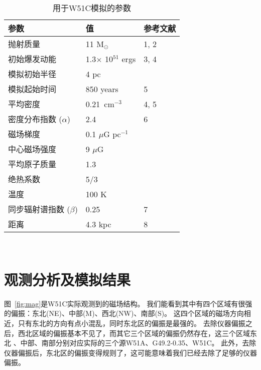 \begin{table*}
  \caption{用于W51C模拟的参数}
  \label{table:parameters}
  \centering
  \begin{tabular}{l l l}
      \hline\hline
      参数                         & 值           & 参考文献               \\
      \hline
      抛射质量                      & 11 M$_{\odot}$ & 1, 2\\
      初始爆发动能                  & 1.3$\times$ 10$^{51}$ ergs & 3, 4\\
      模拟初始半径                  & 4 pc            &\\
      模拟起始时间                  & 850 years       & 5\\
      \hline
      平均密度                      & 0.21\ cm$^{-3}$ & 4, 5\\
      密度分布指数 ($\alpha$)       & 2.4             & 6\\
      磁场梯度                      & 0.1 $\mu$G pc$^{-1}$    &\\
      中心磁场强度                  & 9 $\mu$G        &\\
      平均原子质量                  & 1.3             &\\
      绝热系数                      & 5/3             &\\
      温度                         & 100 K           &\\
      \hline
      同步辐射谱指数 ($\beta$)       & 0.25            & 7\\
      距离                          & 4.3 kpc         & 8\\
      \hline
  \end{tabular}\\
\end{table*}




\section{观测分析及模拟结果}

图~\ref{fig:mag}是W51C实际观测到的磁场结构。
我们能看到其中有四个区域有很强的偏振：东北(NE)、中部(M)、西北(NW)、南部(S)。
这四个区域的磁场方向相近，只有东北的方向有点小混乱，同时东北区的偏振是最强的。
去除仪器偏振之后，西北区域的偏振基本不见了，而其它三个区域的偏振仍然存在，这三个区域东北
、中部、南部分别对应实际的三个源W51A、G49.2-0.35、W51C。
此外，去除仪器偏振后，东北区的偏振变得规则了，这可能意味着我们已经去除了足够的仪器偏振。


